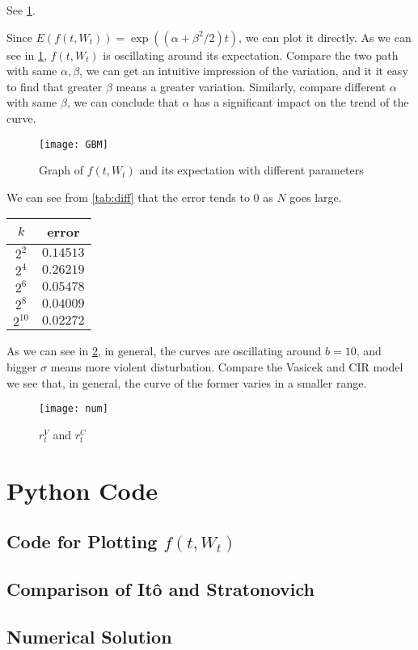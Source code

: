 \problem
\begin{subproblem}[(\arabic*)]
    \item See \cref{fig:GBM}.
    \item Since $E(f(t,W_t))=\exp((\alpha+\beta^2/2)t)$, we can
    plot it directly. As we can see in \cref{fig:GBM},
    $f(t,W_t)$ is oscillating around its expectation.
    Compare the two path with same $\alpha,\beta$, we can
    get an intuitive impression of the variation, and it
    it easy to find that
    greater $\beta$ means a greater variation.
    Similarly, compare different $\alpha$ with same $\beta$,
    we can conclude that $\alpha$ has a significant impact on 
    the trend of the curve.

    \begin{figure}[h]
        \centering
        \texttt{[image: GBM]}
        \caption{Graph of $f(t,W_t)$ and its expectation with different
        parameters}
        \label{fig:GBM}
    \end{figure}
\end{subproblem}

\problem
We can see from \cref{tab:diff} that the error tends to 0 as $N$ goes large.

\begin{margintable}
    \centering
    \begin{tabular}{cc}
        \toprule
        $k$ & error \\
        \midrule
        $2^{2}$ & $0.14513$\\
        $2^{4}$ & $0.26219$\\
        $2^{6}$ & $0.05478$\\
        $2^{8}$ & $0.04009$\\
        $2^{10}$ & $0.02272$\\
        \bottomrule
    \end{tabular}
    \caption{Difference Between It\^o and Stratonovich Integral}
    \label{tab:diff}
\end{margintable}

\problem
As we can see in \cref{fig:num}, in general,
the curves are oscillating around $b=10$, and bigger $\sigma$ means
more violent disturbation.
Compare the Vasicek and CIR model we see that, in general,
the curve of the former varies in a smaller range.


\begin{figure}[h]
    \centering
    \texttt{[image: num]}
    \caption{$r_t^V$ and $r_t^C$}
    \label{fig:num}
\end{figure}

\appendix
\section{Python Code}
\subsection{Code for Plotting $f(t,W_t)$}

\subsection{Comparison of It\^o and Stratonovich}

\subsection{Numerical Solution}
